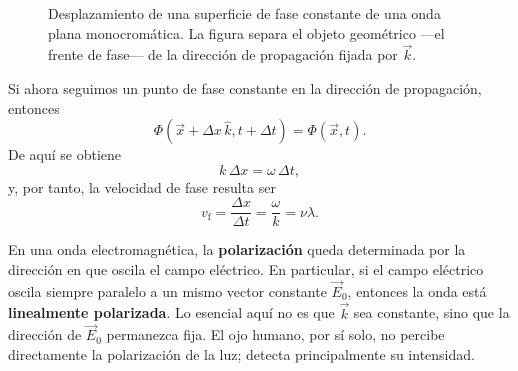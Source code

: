 \documentclass[../main.tex]{subfiles}
\begin{document}
\begin{figure}[ht]
    \endgroup
    \caption{Desplazamiento de una superficie de fase constante de una onda plana monocromática. La figura separa el objeto geométrico ---el frente de fase--- de la dirección de propagación fijada por $\vec k$.}
    \label{fig:avance-frente-fase}
\end{figure}




Si ahora seguimos un punto de fase constante en la dirección de propagación, entonces
\begin{equation*}
    \Phi(\vec x+\Delta x\,\hat k,t+\Delta t)=\Phi(\vec x,t).
\end{equation*}
De aquí se obtiene
\begin{equation*}
    k\,\Delta x=\omega\,\Delta t,
\end{equation*}
y, por tanto, la velocidad de fase resulta ser
\begin{equation*}
    v_{\mathrm f}=\frac{\Delta x}{\Delta t}=\frac{\omega}{k}=\nu\lambda.
\end{equation*}

En una onda electromagnética, la \textbf{polarización} queda determinada por la dirección en que oscila el campo eléctrico. En particular, si el campo eléctrico oscila siempre paralelo a un mismo vector constante $\vec E_0$, entonces la onda está \textbf{linealmente polarizada}. Lo esencial aquí no es que $\vec k$ sea constante, sino que la dirección de $\vec E_0$ permanezca fija. El ojo humano, por sí solo, no percibe directamente la polarización de la luz; detecta principalmente su intensidad.
\end{document}
